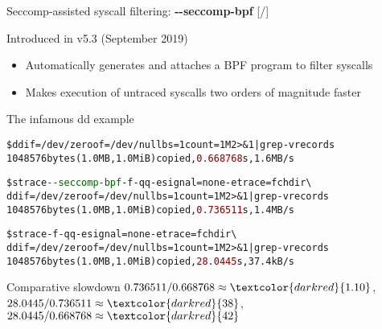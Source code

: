 \documentclass[unicode,aspectratio=169,xcolor={table,dvipsnames,usernames}]{beamer}
\begin{document}
\begin{frame}[fragile]{Seccomp-assisted syscall filtering: \textbf{-{}-seccomp-bpf} \hfill [\insertframenumber/\inserttotalframenumber]}
\begin{block}{Introduced in v5.3 (September 2019)}
\small
\begin{itemize}
\item Automatically generates and attaches a BPF program to filter syscalls
\item Makes execution of untraced syscalls two orders of magnitude faster
\end{itemize}
\end{block}

\begin{block}{The infamous dd example}
\scriptsize
\begin{alltt}
\$ dd if=/dev/zero of=/dev/null bs=1 count=1M 2>\&1 | grep -v records
1048576 bytes (1.0 MB, 1.0 MiB) copied, \textcolor{darkred}{0.668768} s, 1.6 MB/s

\$ strace \textcolor{darkgreen}{-{}-seccomp-bpf} -f -qq -e signal=none -e trace=fchdir \textbackslash
  dd if=/dev/zero of=/dev/null bs=1 count=1M 2>\&1 | grep -v records
1048576 bytes (1.0 MB, 1.0 MiB) copied, \textcolor{darkred}{0.736511} s, 1.4 MB/s

\$ strace -f -qq -e signal=none -e trace=fchdir \textbackslash
  dd if=/dev/zero of=/dev/null bs=1 count=1M 2>\&1 | grep -v records
1048576 bytes (1.0 MB, 1.0 MiB) copied, \textcolor{darkred}{28.0445} s, 37.4 kB/s
\end{alltt}
\end{block}

\begin{block}{Comparative slowdown}
$0.736511 / 0.668768 \approx \textcolor{darkred}{1.10}$,
$28.0445 / 0.736511 \approx \textcolor{darkred}{38}$,
$28.0445 / 0.668768 \approx \textcolor{darkred}{42}$
\end{block}
\end{frame}
\end{document}

